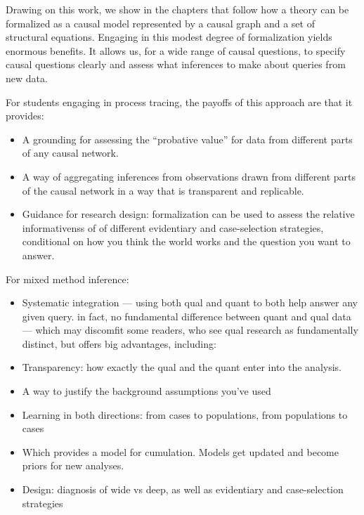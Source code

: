 \documentclass[
  12pt,
]{book}
\providecommand{\tightlist}{%
  \setlength{\itemsep}{0pt}\setlength{\parskip}{0pt}}
\begin{document}
Drawing on this work, we show in the chapters that follow how a theory can be formalized as a causal model represented by a causal graph and a set of structural equations. Engaging in this modest degree of formalization yields enormous benefits. It allows us, for a wide range of causal questions, to specify causal questions clearly and assess what inferences to make about queries from new data.

For students engaging in process tracing, the payoffs of this approach are that it provides:

\begin{itemize}
\item
  A grounding for assessing the ``probative value'' for data from different parts of any causal network.
\item
  A way of aggregating inferences from observations drawn from different parts of the causal network in a way that is transparent and replicable.
\end{itemize}

\begin{itemize}
\tightlist
\item
  Guidance for research design: formalization can be used to assess the relative informativenss of of different evidentiary and case-selection strategies, conditional on how you think the world works and the question you want to answer.
\end{itemize}

For mixed method inference:

\begin{itemize}
\item
  Systematic integration --- using both qual and quant to both help answer any given query. in fact, no fundamental difference between quant and qual data --- which may discomfit some readers, who see qual research as fundamentally distinct, but offers big advantages, including:
\item
  Transparency: how exactly the qual and the quant enter into the analysis.
\item
  A way to justify the background assumptions you've used
\item
  Learning in both directions: from cases to populations, from populations to cases
\item
  Which provides a model for cumulation. Models get updated and become priors for new analyses.
\item
  Design: diagnosis of wide vs deep, as well as evidentiary and case-selection strategies
\end{itemize}
\end{document}
